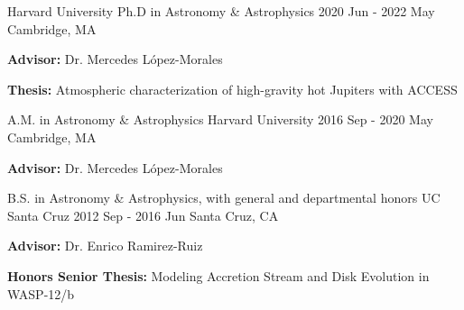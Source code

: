 
\begin{cventries}

  \cventry
    {Harvard University} %
    {Ph.D in Astronomy \& Astrophysics} %
    {2020 Jun - 2022 May} %
    {Cambridge, MA} %
    {
    \begin{cvitems}
        \item[] \textbf{Advisor:} Dr. Mercedes López-Morales
        \item[] \textbf{Thesis:} Atmospheric characterization of high-gravity hot Jupiters with ACCESS
    \end{cvitems}
    }
    
  \cventry
    {A.M. in Astronomy \& Astrophysics} %
    {Harvard University} %
    {2016 Sep - 2020 May} %
    {Cambridge, MA} %
    {
    \begin{cvitems}
        \item[] \textbf{Advisor:} Dr. Mercedes López-Morales
    \end{cvitems}
    }

  \cventry
    {B.S. in Astronomy \& Astrophysics, with general and departmental honors} %
    {UC Santa Cruz} %
    {2012 Sep - 2016 Jun} %
    {Santa Cruz, CA} %
    {
    \begin{cvitems}
        \item[] \textbf{Advisor:} Dr. Enrico Ramirez-Ruiz
        \item[] \textbf{Honors Senior Thesis:} Modeling Accretion Stream and Disk Evolution in WASP-12/b
    \end{cvitems}
    }
    
\end{cventries}